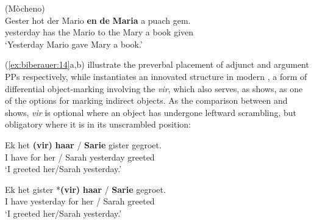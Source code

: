 \documentclass[output=paper]{LSP/langsci}
\begin{document}
\ea%
    (Mòcheno)\label{ex:biberauer:15}    \\
    \gll   Gester      hot der Mario \textbf{en} \textbf{de} \textbf{Maria} a puach  gem.      \\
   yesterday has the Mario to  the Mary  a book   given\\
\glt  ‘Yesterday Mario gave Mary a book.’    \citep[46]{Cognola2012}	\\
    \glt 
    \z

	 




(\ref{ex:biberauer:14}a,b) illustrate the preverbal placement of adjunct and argument PPs respectively, while  instantiates an innovated structure in modern , a form of differential object-marking involving the  \textit{vir}, which also serves, as  shows, as one of the options for marking indirect objects. As the comparison between  and  shows, \textit{vir} is optional where an object has undergone leftward scrambling, but obligatory where it is in its unscrambled position: 

\ea%
    \label{ex:biberauer:16}
    \ea \label{ex:biberauer:16a}
    \gll    Ek het   \textbf{(vir)} \textbf{haar} / \textbf{Sarie}  gister        gegroet.   \\
	  I    have  for   her / Sarah  yesterday greeted\\
    \glt ‘I greeted her/Sarah yesterday.’
      

 \ex  \label{ex:biberauer:16b}
\gll  Ek  het    gister    *\textbf{(vir)} \textbf{haar} / \textbf{Sarie}   gegroet.\\
    I     have yesterday for   her / Sarah  greeted\\
\glt    ‘I greeted her/Sarah yesterday.’
\z
\z
\end{document}
